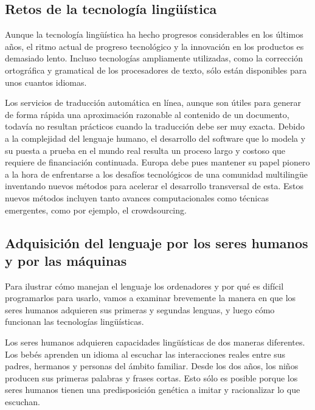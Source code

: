 \begin{multicols}{2}
\subsection{Retos de la tecnología lingüística}

Aunque la tecnología lingüística ha hecho progresos considerables en los últimos años, el ritmo actual de progreso tecnológico y la innovación en los productos es demasiado lento. Incluso tecnologías ampliamente utilizadas, como la corrección ortográfica y gramatical de los procesadores de texto, sólo están disponibles para unos cuantos idiomas. 


Los servicios de traducción automática en línea, aunque son útiles para generar de forma rápida una aproximación razonable al contenido de un documento, todavía no resultan prácticos cuando la traducción debe ser muy exacta. Debido a la complejidad del lenguaje humano, el desarrollo del software que lo modela y su puesta a prueba en el mundo real resulta un proceso largo y costoso que requiere de financiación continuada. Europa debe pues mantener su papel pionero a la hora de enfrentarse a los desafíos tecnológicos de una comunidad multilingüe inventando  nuevos métodos para acelerar el desarrollo transversal de esta. Estos nuevos  métodos incluyen tanto avances computacionales como técnicas emergentes, como por ejemplo, el crowdsourcing.

\subsection{Adquisición del lenguaje por los seres humanos y por las máquinas}

Para ilustrar cómo manejan el lenguaje los ordenadores y por qué es difícil programarlos para usarlo, vamos a examinar brevemente la manera en que los seres humanos adquieren sus primeras y segundas lenguas, y luego cómo funcionan las tecnologías lingüísticas.


Los seres humanos adquieren capacidades lingüísticas de dos maneras diferentes. Los bebés aprenden un idioma al escuchar las interacciones reales entre sus padres, hermanos y personas del ámbito familiar. Desde los dos años, los niños producen sus primeras palabras y frases cortas. Esto sólo es posible porque los seres humanos tienen una predisposición genética a imitar y racionalizar lo que escuchan.


\end{multicols}

